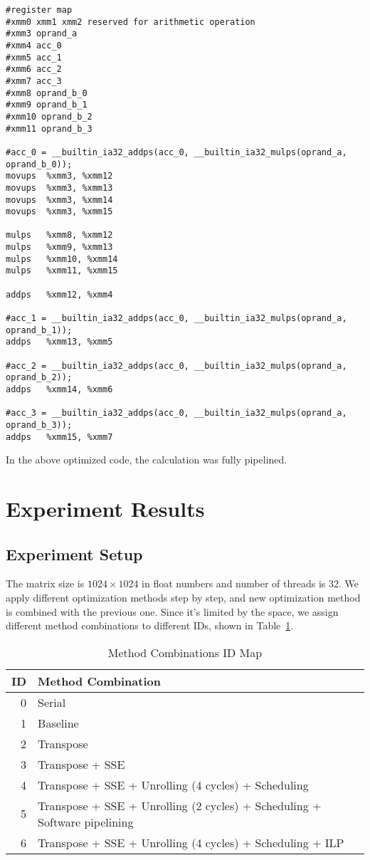 \documentclass[12pt]{article}
\begin{document}
\scriptsize
\begin{verbatim}
#register map
#xmm0 xmm1 xmm2 reserved for arithmetic operation
#xmm3 oprand_a
#xmm4 acc_0
#xmm5 acc_1
#xmm6 acc_2
#xmm7 acc_3
#xmm8 oprand_b_0
#xmm9 oprand_b_1
#xmm10 oprand_b_2
#xmm11 oprand_b_3

#acc_0 = __builtin_ia32_addps(acc_0, __builtin_ia32_mulps(oprand_a, oprand_b_0));
movups  %xmm3, %xmm12
movups  %xmm3, %xmm13
movups  %xmm3, %xmm14
movups  %xmm3, %xmm15

mulps   %xmm8, %xmm12
mulps   %xmm9, %xmm13
mulps   %xmm10, %xmm14
mulps   %xmm11, %xmm15

addps   %xmm12, %xmm4

#acc_1 = __builtin_ia32_addps(acc_0, __builtin_ia32_mulps(oprand_a, oprand_b_1));
addps   %xmm13, %xmm5

#acc_2 = __builtin_ia32_addps(acc_0, __builtin_ia32_mulps(oprand_a, oprand_b_2));
addps   %xmm14, %xmm6

#acc_3 = __builtin_ia32_addps(acc_0, __builtin_ia32_mulps(oprand_a, oprand_b_3));
addps   %xmm15, %xmm7
\end{verbatim}
\normalsize

In the above optimized code, the calculation was fully pipelined.

\section{Experiment Results}
\subsection{Experiment Setup}
The matrix size is $1024\times 1024$ in float numbers and number of 
threads is 32. We apply different optimization methods step by step, 
and new optimization method is combined with the previous one. Since 
it's limited by the space, we assign different method combinations to 
different IDs, shown in Table~\ref{tab:methods}.

\begin{table}[h!]
	\small
	\begin{center}
	\caption{\label{tab:methods} Method Combinations ID Map}
	\begin{tabular}{|r|l|}
		\hline
		ID & Method Combination \\ \hline
		0 &	Serial \\ \hline
		1 & Baseline \\ \hline
    2 & Transpose \\ \hline
    3 & Transpose + SSE \\ \hline
    4 & Transpose + SSE + Unrolling (4 cycles) + Scheduling \\ \hline
    5 & Transpose + SSE + Unrolling (2 cycles) + Scheduling + 
      Software pipelining \\ \hline
    6 & Transpose + SSE + Unrolling (4 cycles) + Scheduling + ILP\\ \hline
	\end{tabular}
	\end{center}
\end{table}
\end{document}
